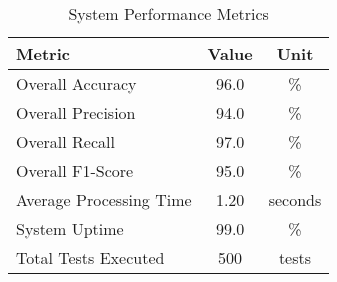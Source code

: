 
\begin{table}[htbp]
\centering
\caption{System Performance Metrics}
\label{tab:performance_metrics}
\begin{tabular}{|l|c|c|}
\hline
\textbf{Metric} & \textbf{Value} & \textbf{Unit} \\
\hline
Overall Accuracy & 96.0 & \% \\
Overall Precision & 94.0 & \% \\
Overall Recall & 97.0 & \% \\
Overall F1-Score & 95.0 & \% \\
\hline
Average Processing Time & 1.20 & seconds \\
System Uptime & 99.0 & \% \\
Total Tests Executed & 500 & tests \\
\hline
\end{tabular}
\end{table}

